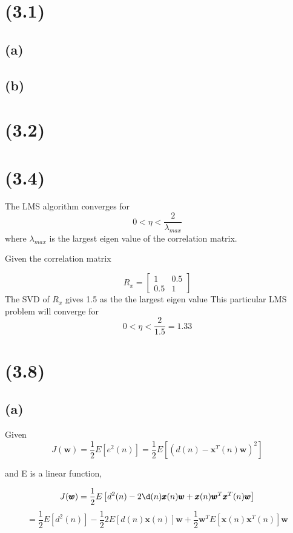 \documentclass[paper=a4, fontsize=11pt]{scrartcl} %
\begin{document}
\section{ (3.1) }
    
\subsection{ (a) }

\subsection{ (b) }

\section{ (3.2) }
\section{ (3.4) }
The LMS algorithm converges for 
$$0 < \eta < \frac{2}{\lambda_{max}} $$ 
where $\lambda_{max}$ is the largest eigen value of the correlation matrix.

Given the correlation matrix

$$
R_x =  
\left[ 
\begin{array}{cc}
1 & 0.5 \\ 
0.5 & 1 
\end{array} 
\right]
$$
The SVD of $R_x$ gives 1.5 as the the largest eigen value
This particular LMS problem will converge for 
$$ 0 < \eta <  \frac{2}{1.5} = 1.33 $$
\section{ (3.8) }
\subsection{ (a) }
Given 
$$ J(\pmb{w}) = \frac{1}{2}E[e^2(n)] = \frac{1}{2}E\left[(d(n)-\pmb{x}^T(n)\pmb{w})^2\right]$$

and E is a linear function,

$$ J(\pmb{w}) = \frac{1}{2} E\left[ d^2(n)-2\d(n) \pmb{x}(n)\pmb{w} + \pmb{x}(n)\pmb{w}^T\pmb{x}^T(n)\pmb{w} \right]$$
$$ = 
\frac{1}{2}  E\left[ d^2(n)\right] - 
\frac{1}{2}  2  E\left[d(n) \pmb{x}(n) \right]\pmb{w} + 
\frac{1}{2}  \pmb{w}^T  E\left[\pmb{x}(n) \pmb{x}^T(n) \right]\pmb{w}$$
\end{document}
